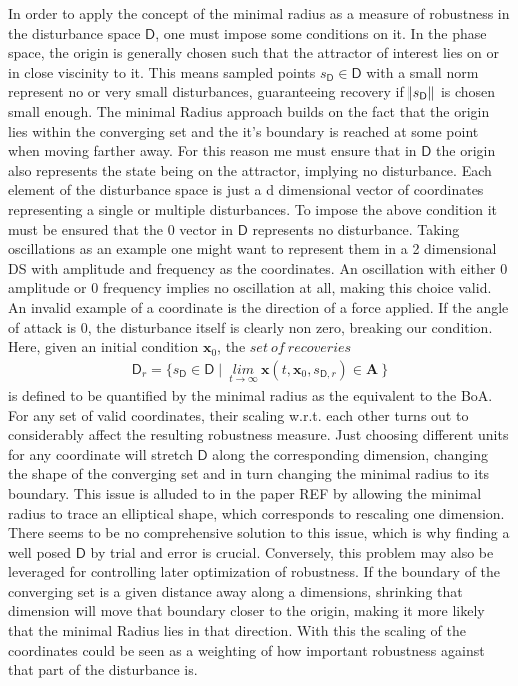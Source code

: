     In order to apply the concept of the minimal radius as a measure of robustness in the disturbance space $\mathsf{D}$, one must impose some conditions on it.
    In the phase space, the origin is generally chosen such that the attractor of interest lies on or in close viscinity to it. This means sampled points $s_{\mathsf{D}} \in \mathsf{D}$ with a small norm represent no or very small disturbances, guaranteeing recovery if $\norm{s_{\mathsf{D}}}$ is chosen small enough. The minimal Radius approach builds on the fact that the origin lies within the converging set and the it's boundary is reached at some point when moving farther away. 
    For this reason me must ensure that in $\mathsf{D}$ the origin also represents the state being on the attractor, implying no disturbance.
    Each element of the disturbance space is just a d dimensional vector of coordinates representing a single or multiple disturbances. To impose the above condition it must be ensured that the 0 vector in $\mathsf{D}$ represents no disturbance. 
    Taking oscillations as an example one might want to represent them in a 2 dimensional DS with amplitude and frequency as the coordinates. An oscillation with either 0 amplitude or 0 frequency implies no oscillation at all, making this choice valid.
    An invalid example of a coordinate is the direction of a force applied. If the angle of attack is 0, the disturbance itself is clearly non zero, breaking our condition.
    Here, given an initial condition $\mathbf{x}_0$, the $set\ of\ recoveries$ 
    \begin{gather} \label{eq:9}
    \mathsf{D}_r = \{ s_{\mathsf{D}} \in \mathsf{D} \mid\ \underset{t \rightarrow \infty}{lim} \ \mathbf{x}(t,\mathbf{x}_0,s_{\mathsf{D},r}) \in \mathbf{A}\ \}\end{gather}
    is defined to be quantified by the minimal radius as the equivalent to the BoA.
    For any set of valid coordinates, their scaling w.r.t. each other turns out to considerably affect the resulting robustness measure. Just choosing different units for any coordinate will stretch $\mathsf{D}$ along the corresponding dimension, changing the shape of the converging set and in turn changing the minimal radius to its boundary. This issue is alluded to in the paper REF by allowing the minimal radius to trace an elliptical shape, which corresponds to rescaling one dimension. There seems to be no comprehensive solution to this issue, which is why finding a well posed $\mathsf{D}$ by trial and error is crucial. 
    Conversely, this problem may also be leveraged for controlling later optimization of robustness. If the boundary of the converging set is a given distance away along a dimensions, shrinking that dimension will move that boundary closer to the origin, making it more likely that the minimal Radius lies in that direction. With this the scaling of the coordinates could be seen as a weighting of how important robustness against that part of the disturbance is. 

